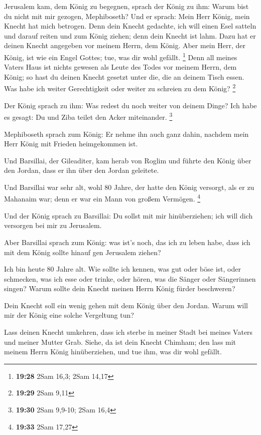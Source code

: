 Jerusalem kam, dem König zu begegnen, sprach der König zu ihm: Warum
bist du nicht mit mir gezogen, Mephiboseth?  Und er sprach:
Mein Herr König, mein Knecht hat mich betrogen. Denn dein Knecht
gedachte, ich will einen Esel satteln und darauf reiten und zum König
ziehen; denn dein Knecht ist lahm.  Dazu hat er deinen
Knecht angegeben vor meinem Herrn, dem König. Aber mein Herr, der König,
ist wie ein Engel Gottes; tue, was dir wohl gefällt. \footnote{\textbf{19:28}
  2Sam 16,3; 2Sam 14,17}  Denn all meines Vaters Haus ist
nichts gewesen als Leute des Todes vor meinem Herrn, dem König; so hast
du deinen Knecht gesetzt unter die, die an deinem Tisch essen. Was habe
ich weiter Gerechtigkeit oder weiter zu schreien zu dem König?
\footnote{\textbf{19:29} 2Sam 9,11}

 Der König sprach zu ihm: Was redest du noch weiter von
deinem Dinge? Ich habe es gesagt: Du und Ziba teilet den Acker
miteinander. \footnote{\textbf{19:30} 2Sam 9,9-10; 2Sam 16,4}

 Mephiboseth sprach zum König: Er nehme ihn auch ganz
dahin, nachdem mein Herr König mit Frieden heimgekommen ist.

 Und Barsillai, der Gileaditer, kam herab von Roglim und
führte den König über den Jordan, dass er ihn über den Jordan geleitete.

 Und Barsillai war sehr alt, wohl 80 Jahre, der hatte den
König versorgt, als er zu Mahanaim war; denn er war ein Mann von großem
Vermögen. \footnote{\textbf{19:33} 2Sam 17,27}

 Und der König sprach zu Barsillai: Du sollst mit mir
hinüberziehen; ich will dich versorgen bei mir zu Jerusalem.

 Aber Barsillai sprach zum König: was ist's noch, das ich
zu leben habe, dass ich mit dem König sollte hinauf gen Jerusalem
ziehen?

 Ich bin heute 80 Jahre alt. Wie sollte ich kennen, was gut
oder böse ist, oder schmecken, was ich esse oder trinke, oder hören, was
die Sänger oder Sängerinnen singen? Warum sollte dein Knecht meinen
Herrn König fürder beschweren?

 Dein Knecht soll ein wenig gehen mit dem König über den
Jordan. Warum will mir der König eine solche Vergeltung tun?

 Lass deinen Knecht umkehren, dass ich sterbe in meiner
Stadt bei meines Vaters und meiner Mutter Grab. Siehe, da ist dein
Knecht Chimham; den lass mit meinem Herrn König hinüberziehen, und tue
ihm, was dir wohl gefällt.

